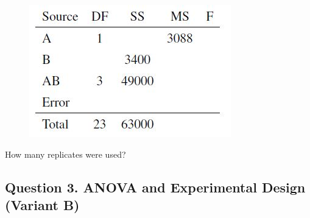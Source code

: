\documentclass[a4paper,12pt]{article}
\begin{document}
\begin{itemize}
\begin{figure}[h!]
\centering
\includegraphics[width=0.5\linewidth]{image/SampleANOVAReplicate}
\end{figure}

How many replicates were used?
\end{itemize}

\newpage	
\subsection*{Question 3. ANOVA and Experimental Design (Variant B) }
\end{document}
